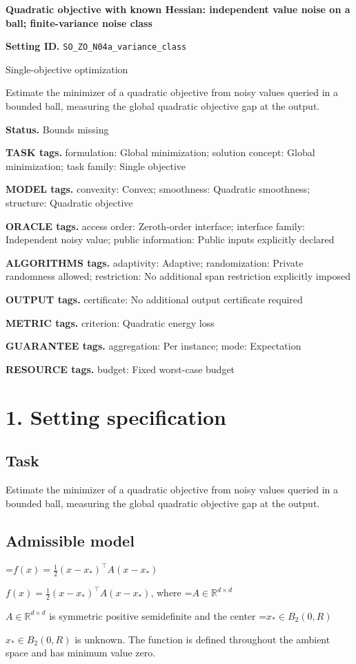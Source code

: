\documentclass[10pt,a4paper]{article}
\newcommand{\AtlasMath}[1]{\par\begingroup\centering\setbox0=\hbox{$\displaystyle #1$}\ifdim\wd0>1.4\linewidth\typeout{ATLAS WIDE FORMULA: \the\wd0}\fi\ifdim\wd0>\linewidth\resizebox{\linewidth}{!}{\box0}\else\box0\fi\par\endgroup}
\newcommand{\AtlasInlineMath}[1]{\begingroup\setbox0=\hbox{$#1$}\ifdim\wd0>.4\linewidth\endgroup\AtlasMath{#1}\else\endgroup$#1$\fi}
\begin{document}
\raggedright

{\LARGE\bfseries\sffamily\color{AtlasNavy} Quadratic objective with known Hessian: independent value noise on a ball; finite-variance noise class\par}\vspace{5pt}
\textbf{Setting ID.} \texttt{SO\_\allowbreak{}ZO\_\allowbreak{}N04a\_\allowbreak{}variance\_\allowbreak{}class}

Single-objective optimization

Estimate the minimizer of a quadratic objective from noisy values queried in a bounded ball, measuring the global quadratic objective gap at the output.

\textbf{Status.} Bounds missing

\textbf{TASK tags.} formulation: Global minimization; solution concept: Global minimization; task family: Single objective

\textbf{MODEL tags.} convexity: Convex; smoothness: Quadratic smoothness; structure: Quadratic objective

\textbf{ORACLE tags.} access order: Zeroth-order interface; interface family: Independent noisy value; public information: Public inputs explicitly declared

\textbf{ALGORITHMS tags.} adaptivity: Adaptive; randomization: Private randomness allowed; restriction: No additional span restriction explicitly imposed

\textbf{OUTPUT tags.} certificate: No additional output certificate required

\textbf{METRIC tags.} criterion: Quadratic energy loss

\textbf{GUARANTEE tags.} aggregation: Per instance; mode: Expectation

\textbf{RESOURCE tags.} budget: Fixed worst-case budget

\section{1. Setting specification}
\subsection{Task}
Estimate the minimizer of a quadratic objective from noisy values queried in a bounded ball, measuring the global quadratic objective gap at the output.

\subsection{Admissible model}
\AtlasInlineMath{f(x)=\frac12(x-x_*)^\top A(x-x_*)}, where \AtlasInlineMath{A\in\mathbb{R}^{d\times d}} is symmetric positive semidefinite and the center \AtlasInlineMath{x_*\in B_2(0,R)} is unknown. The function is defined throughout the ambient space and has minimum value zero.
\end{document}
